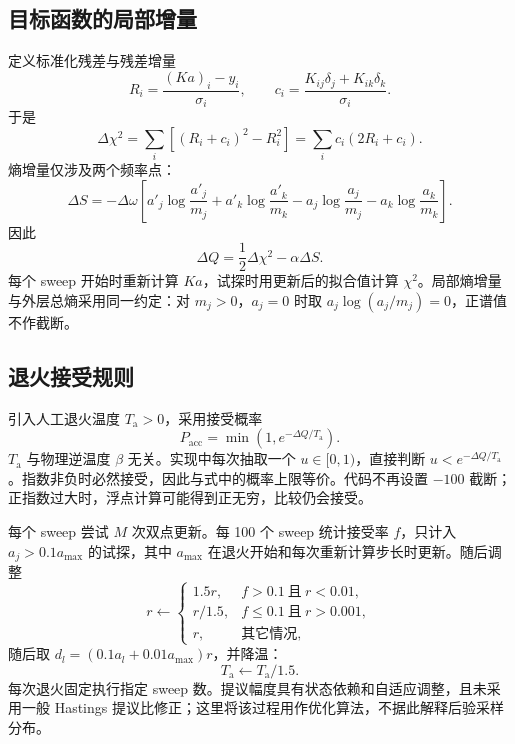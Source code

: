 \documentclass[UTF8,fontset=fandol,11pt]{ctexart}
\begin{document}
\subsection{目标函数的局部增量}
定义标准化残差与残差增量
\begin{equation}
    R_i=\frac{(Ka)_i-y_i}{\sigma_i},\qquad c_i=\frac{K_{ij}\delta_j+K_{ik}\delta_k}{\sigma_i}.
\end{equation}
于是
\begin{equation}
    \Delta\chi^2=\sum_i[(R_i+c_i)^2-R_i^2]=\sum_i c_i(2R_i+c_i).
\end{equation}
熵增量仅涉及两个频率点：
\begin{equation}
    \Delta S=-\Delta\omega\left[a'_j\log\frac{a'_j}{m_j}+a'_k\log\frac{a'_k}{m_k}-a_j\log\frac{a_j}{m_j}-a_k\log\frac{a_k}{m_k}\right].
\end{equation}
因此
\begin{equation}
    \Delta Q=\frac12\Delta\chi^2-\alpha\Delta S.
\end{equation}
每个 sweep 开始时重新计算 $Ka$，试探时用更新后的拟合值计算 $\chi^2$。局部熵增量与外层总熵采用同一约定：对 $m_j>0$，$a_j=0$ 时取 $a_j\log(a_j/m_j)=0$，正谱值不作截断。

\subsection{退火接受规则}
引入人工退火温度 $T_{\mathrm a}>0$，采用接受概率
\begin{equation}
    P_{\mathrm{acc}}=\min\left(1,e^{-\Delta Q/T_{\mathrm a}}\right).
\end{equation}
$T_{\mathrm a}$ 与物理逆温度 $\beta$ 无关。实现中每次抽取一个 $u\in[0,1)$，直接判断 $u<e^{-\Delta Q/T_{\mathrm a}}$。指数非负时必然接受，因此与式中的概率上限等价。代码不再设置 $-100$ 截断；正指数过大时，浮点计算可能得到正无穷，比较仍会接受。

每个 sweep 尝试 $M$ 次双点更新。每 100 个 sweep 统计接受率 $f$，只计入 $a_j>0.1a_{\max}$ 的试探，其中 $a_{\max}$ 在退火开始和每次重新计算步长时更新。随后调整
\begin{equation}
    r\leftarrow\begin{cases}1.5r,&f>0.1\ \text{且}\ r<0.01,\\r/1.5,&f\leq0.1\ \text{且}\ r>0.001,\\r,&\text{其它情况},\end{cases}
\end{equation}
随后取 $d_l=(0.1a_l+0.01a_{\max})r$，并降温：
\begin{equation}
    T_{\mathrm a}\leftarrow T_{\mathrm a}/1.5.
\end{equation}
每次退火固定执行指定 sweep 数。提议幅度具有状态依赖和自适应调整，且未采用一般 Hastings 提议比修正；这里将该过程用作优化算法，不据此解释后验采样分布。
\end{document}
